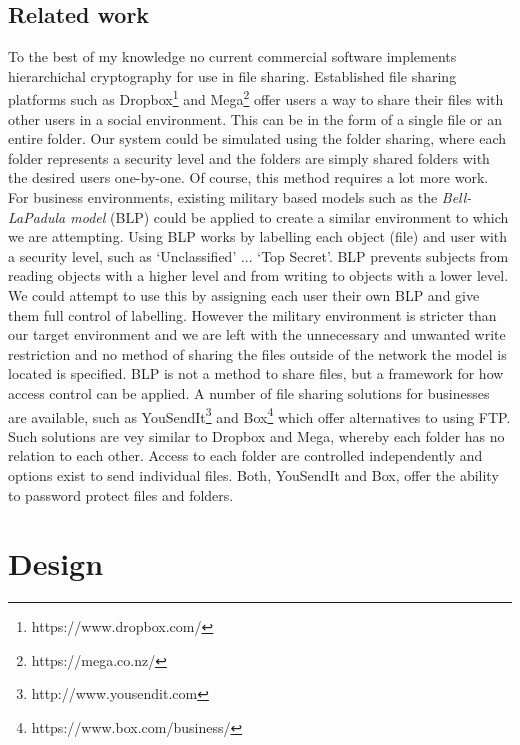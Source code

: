 \documentclass[12pt, titlepage]{article}
\begin{document}
\subsection{Related work}
To the best of my knowledge no current commercial software implements hierarchichal cryptography for use in file sharing.
\newline \indent Established file sharing platforms such as Dropbox\footnote{https://www.dropbox.com/} and Mega\footnote{https://mega.co.nz/} offer users a way to share their files with other users in a social environment. This can be in the form of a single file or an entire folder. Our system could be simulated using the folder sharing, where each folder represents a security level and the folders are simply shared folders with the desired users one-by-one. Of course, this method requires a lot more work.
\newline \indent For business environments, existing military based models such as the \textit{Bell-LaPadula model} (BLP) could be applied to create a similar environment to which we are attempting. Using BLP works by labelling each object (file) and user with a security level, such as `Unclassified' ... `Top Secret'. BLP prevents subjects from reading objects with a higher level and from writing to objects with a lower level. We could attempt to use this by assigning each user their own BLP and give them full control of labelling. However the military environment is stricter than our target environment and we are left with the unnecessary and unwanted write restriction and no method of sharing the files outside of the network the model is located is specified. BLP is not a method to share files, but a framework for how access control can be applied.
\newline \indent A number of file sharing solutions for businesses are available, such as YouSendIt\footnote{http://www.yousendit.com} and Box\footnote{https://www.box.com/business/} which offer alternatives to using FTP. Such solutions are vey similar to Dropbox and Mega, whereby each folder has no relation to each other. Access to each folder are controlled independently and options exist to send individual files. Both, YouSendIt and Box, offer the ability to password protect files and folders.

\section{Design}
\end{document}
